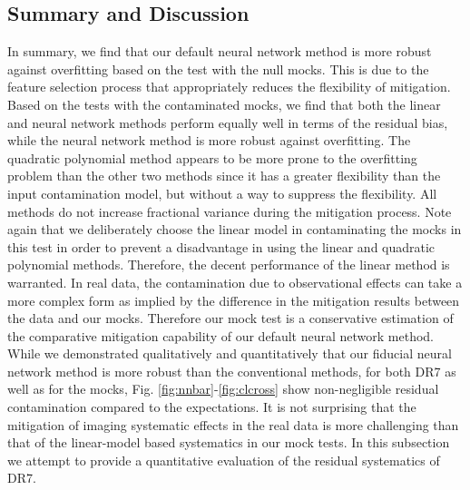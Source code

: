 \subsection{Summary and Discussion}\label{subsec:discussion}
In summary, we find that our default neural network method is more robust against overfitting based on the test with the null mocks. This is due to the feature selection process that appropriately reduces the flexibility of mitigation. Based on the tests with the contaminated mocks, we find that both the linear and neural network methods perform equally well in terms of the residual bias, while the neural network method is more robust against overfitting. The quadratic polynomial method appears to be more prone to the overfitting problem than the other two methods since it has a greater flexibility than the input contamination model, but without a way to suppress the flexibility. All methods do not increase fractional variance during the mitigation process. Note again that we deliberately choose the linear model in contaminating the mocks in this test in order to prevent a disadvantage in using the linear and quadratic polynomial methods.  Therefore, the decent performance of the linear method is warranted. In real data, the contamination due to observational effects can take a more complex form as implied by the difference in the mitigation results between the data and our mocks. Therefore our mock test is a conservative estimation of the comparative mitigation capability of our default neural network method. \\

While we demonstrated qualitatively and quantitatively that our fiducial neural network method is more robust than the conventional methods, for both DR7 as well as for the mocks, Fig. \ref{fig:nnbar}-\ref{fig:clcross} show non-negligible residual contamination compared to the expectations. It is not surprising that the mitigation of imaging systematic effects in the real data is more challenging than that of the linear-model based systematics in our mock tests. In this subsection we attempt to provide a quantitative evaluation of the residual systematics of DR7.\\

